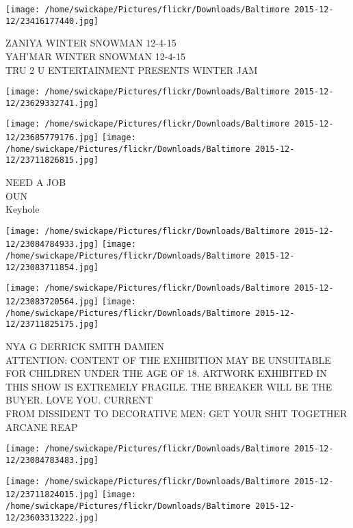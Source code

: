 \documentclass[10pt,letterpaper]{article}
\begin{document}
\texttt{[image: /home/swickape/Pictures/flickr/Downloads/Baltimore 2015-12-12/23416177440.jpg]}

ZANIYA WINTER SNOWMAN 12{-}4{-}15\\
YAH'MAR WINTER SNOWMAN 12{-}4{-}15\\
TRU 2 U ENTERTAINMENT PRESENTS WINTER JAM\\
\pagebreak

\texttt{[image: /home/swickape/Pictures/flickr/Downloads/Baltimore 2015-12-12/23629332741.jpg]}

\vspace{0.25in}
\texttt{[image: /home/swickape/Pictures/flickr/Downloads/Baltimore 2015-12-12/23685779176.jpg]}
\texttt{[image: /home/swickape/Pictures/flickr/Downloads/Baltimore 2015-12-12/23711826815.jpg]}

NEED A JOB\\
OUN\\
Keyhole\\
\pagebreak

\texttt{[image: /home/swickape/Pictures/flickr/Downloads/Baltimore 2015-12-12/23084784933.jpg]}
\texttt{[image: /home/swickape/Pictures/flickr/Downloads/Baltimore 2015-12-12/23083711854.jpg]}

\texttt{[image: /home/swickape/Pictures/flickr/Downloads/Baltimore 2015-12-12/23083720564.jpg]}
\texttt{[image: /home/swickape/Pictures/flickr/Downloads/Baltimore 2015-12-12/23711825175.jpg]}

NYA G DERRICK SMITH DAMIEN\\
ATTENTION: CONTENT OF THE EXHIBITION MAY BE UNSUITABLE FOR CHILDREN UNDER THE AGE OF 18.  ARTWORK EXHIBITED IN THIS SHOW IS EXTREMELY FRAGILE.  THE BREAKER WILL BE THE BUYER.  LOVE YOU.  CURRENT\\
FROM DISSIDENT TO DECORATIVE MEN: GET YOUR SHIT TOGETHER\\
ARCANE REAP\\
\pagebreak

\texttt{[image: /home/swickape/Pictures/flickr/Downloads/Baltimore 2015-12-12/23084783483.jpg]}

\vspace{0.25in}
\texttt{[image: /home/swickape/Pictures/flickr/Downloads/Baltimore 2015-12-12/23711824015.jpg]}
\texttt{[image: /home/swickape/Pictures/flickr/Downloads/Baltimore 2015-12-12/23603313222.jpg]}
\end{document}
